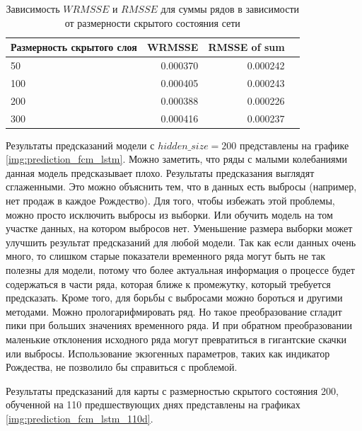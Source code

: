 \begin{table}
    \caption{Зависимость $ WRMSSE $ и $ RMSSE $ для суммы рядов в зависимости от размерности скрытого состояния сети }
    \centering
    \begin{tabular}{|l|r||r|r|}
        \hline
            Размерность скрытого слоя &   WRMSSE & RMSSE of sum \\
        \hline
            50                         & 0.000370 & 0.000242 \\
            100                        & 0.000405 & 0.000243 \\
            200                        & 0.000388 & 0.000226 \\
            300                        & 0.000416 & 0.000237 \\
        \hline
    \end{tabular}
    \label{tbl:rmsse_fcm_lstm}
\end{table}

Результаты предсказаний модели с $ hidden\_size = 200 $ представлены на графике \ref{img:prediction_fcm_lstm}.
Можно заметить, что ряды с малыми колебаниями данная модель предсказывает плохо.
Результаты предсказания выглядят сглаженными. Это можно объяснить тем, что
в данных есть выбросы (например, нет продаж в каждое Рождество).
Для того, чтобы избежать этой проблемы, можно просто исключить  выбросы из выборки.
Или обучить модель на том участке данных, на котором выбросов нет.
Уменьшение размера выборки может улучшить результат предсказаний для любой модели.
Так как если данных очень много, то слишком старые показатели временного ряда
могут быть не так полезны для модели, потому что более актуальная информация
о процессе будет содержаться в части ряда, которая ближе к промежутку, который
требуется предсказать.
Кроме того, для борьбы с выбросами можно бороться и другими методами.
Можно прологарифмировать ряд. Но такое преобразование сгладит пики при больших значениях
временного ряда. И при обратном преобразовании маленькие отклонения исходного ряда
могут превратиться в гигантские скачки или выбросы.
Использование экзогенных параметров, таких как индикатор Рождества, не позволило бы
справиться с проблемой.

Результаты предсказаний для карты с размерностью скрытого состояния 200, обученной на 110 предшествующих днях
представлены на графиках \ref{img:prediction_fcm_lstm_110d}.


